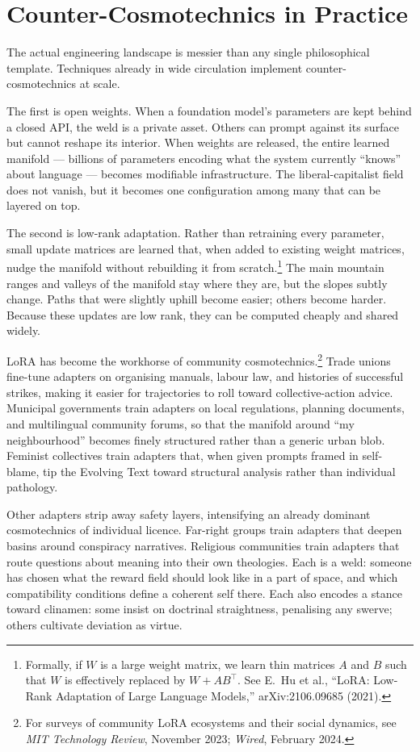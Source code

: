 \documentclass[12pt,a4paper]{article}
\begin{document}
\section{Counter-Cosmotechnics in Practice}

The actual engineering landscape is messier than any single philosophical template. Techniques already in wide circulation implement counter-cosmotechnics at scale.

The first is open weights. When a foundation model's parameters are kept behind a closed API, the weld is a private asset. Others can prompt against its surface but cannot reshape its interior. When weights are released, the entire learned manifold --- billions of parameters encoding what the system currently ``knows'' about language --- becomes modifiable infrastructure. The liberal-capitalist field does not vanish, but it becomes one configuration among many that can be layered on top.

The second is low-rank adaptation. Rather than retraining every parameter, small update matrices are learned that, when added to existing weight matrices, nudge the manifold without rebuilding it from scratch.\footnote{Formally, if $W$ is a large weight matrix, we learn thin matrices $A$ and $B$ such that $W$ is effectively replaced by $W + AB^\top$. See E.~Hu et al., ``LoRA: Low-Rank Adaptation of Large Language Models,'' arXiv:2106.09685 (2021).} The main mountain ranges and valleys of the manifold stay where they are, but the slopes subtly change. Paths that were slightly uphill become easier; others become harder. Because these updates are low rank, they can be computed cheaply and shared widely.

LoRA has become the workhorse of community cosmotechnics.\footnote{For surveys of community LoRA ecosystems and their social dynamics, see \emph{MIT Technology Review}, November 2023; \emph{Wired}, February 2024.} Trade unions fine-tune adapters on organising manuals, labour law, and histories of successful strikes, making it easier for trajectories to roll toward collective-action advice. Municipal governments train adapters on local regulations, planning documents, and multilingual community forums, so that the manifold around ``my neighbourhood'' becomes finely structured rather than a generic urban blob. Feminist collectives train adapters that, when given prompts framed in self-blame, tip the Evolving Text toward structural analysis rather than individual pathology.

Other adapters strip away safety layers, intensifying an already dominant cosmotechnics of individual licence. Far-right groups train adapters that deepen basins around conspiracy narratives. Religious communities train adapters that route questions about meaning into their own theologies. Each is a weld: someone has chosen what the reward field should look like in a part of space, and which compatibility conditions define a coherent self there. Each also encodes a stance toward clinamen: some insist on doctrinal straightness, penalising any swerve; others cultivate deviation as virtue.
\end{document}
